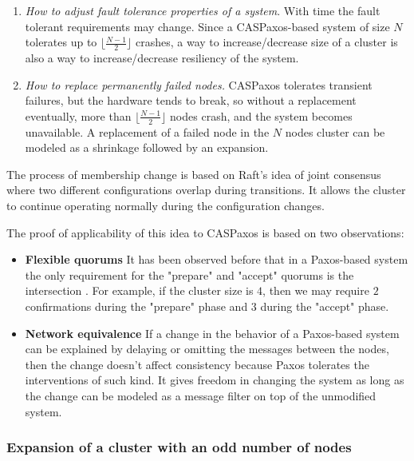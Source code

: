 \documentclass[12pt]{article}
\theoremstyle{definition}
\begin{document}
\begin{enumerate}
  \item {\it How to adjust fault tolerance properties of a system}. With time the fault tolerant requirements may change. Since a CASPaxos-based system of size $N$ tolerates up to $\lfloor \frac{N-1}2 \rfloor$ crashes, a way to increase/decrease size of a cluster is also a way to increase/decrease resiliency of the system.

  \item {\it How to replace permanently failed nodes.} CASPaxos tolerates transient failures, but the hardware tends to break, so without a replacement eventually, more than $\lfloor \frac{N-1}2 \rfloor$ nodes crash, and the system becomes unavailable. A replacement of a failed node in the $N$ nodes cluster can be modeled as a shrinkage followed by an expansion.
\end{enumerate}

The process of membership change is based on Raft's idea of joint consensus where two different configurations overlap during transitions. It allows the cluster to continue operating normally during the configuration changes.

The proof of applicability of this idea to CASPaxos is based on two observations:

\begin{itemize}
  \item {\bf Flexible quorums} It has been observed before that in a Paxos-based system the only requirement for the "prepare" and "accept" quorums is the intersection \cite{abcds}\cite{vertical}\cite{fpaxos}. For example, if the cluster size is $4$, then we may require $2$ confirmations during the "prepare" phase and $3$ during the "accept" phase.
  
  \item {\bf Network equivalence} If a change in the behavior of a Paxos-based system can be explained by delaying or omitting the messages between the nodes, then the change doesn't affect consistency because Paxos tolerates the interventions of such kind. It gives freedom in changing the system as long as the change can be modeled as a message filter on top of the unmodified system.
\end{itemize}

\subsubsection{Expansion of a cluster with an odd number of nodes}
\end{document}
